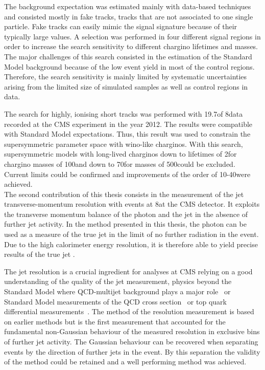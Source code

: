 The background expectation was estimated mainly with data-based techniques and consisted mostly in fake tracks, \ie tracks that are not associated to one single particle. 
Fake tracks can easily mimic the signal signature because of their typically large \dedx values.
A selection was performed in four different signal regions in order to increase the search sensitivity to different chargino lifetimes and masses.
The major challenges of this search consisted in the estimation of the Standard Model background because of the low event yield in most of the control regions.
Therefore, the search sensitivity is mainly limited by systematic uncertainties arising from the limited size of simulated samples as well as control regions in data.

The search for highly, ionising short tracks was performed with 19.7\fbinv of 8\tev data recorded at the CMS experiment in the year 2012.
The results were compatible with Standard Model expectations.
Thus, this result was used to constrain the supersymmetric parameter space with wino-like charginos.
With this search, supersymmetric models with long-lived charginos down to lifetimes of 2\cm for chargino masses of 100\gev and down to 70\cm for masses of 500\gev could be excluded.
Current limits could be confirmed and improvements of the order of 10-40\gev were achieved.\\


The second contribution of this thesis consists in the measurement of the jet transverse-momentum resolution with \GAMJET events at 8\tev at the CMS detector.
It exploits the transverse momentum balance of the photon and the jet in the absence of further jet activity.
In the method presented in this thesis, the photon \pt can be used as a measure of the true jet \pt in the limit of no further radiation in the event.
Due to the high calorimeter energy resolution, it is therefore able to yield precise results of the true jet \pt.

The jet \pt resolution is a crucial ingredient for analyses at CMS relying on a good understanding of the quality of the jet \pt measurement, \eg physics beyond the Standard Model where QCD-multijet background plays a major role~\cite{bib:CMS:RA2_8TeV,bib:CMS:MT2_8TeV,bib:CMS:AlphaT_8TeV} or Standard Model measurements of the QCD cross section~\cite{bib:CMS:QCD_measurements} or top quark differential measurements~\cite{bib:CMS:TopCrossSection_8TeV}.
The method of the resolution measurement is based on earlier methods but is the first measurement that accounted for the fundamental non-Gaussian behaviour of the measured resolution in exclusive bins of further jet activity.
The Gaussian behaviour can be recovered when separating events by the direction of further jets in the event.
By this separation the validity of the method could be retained and a well performing method was achieved.

